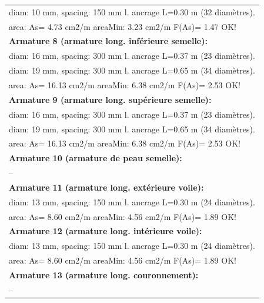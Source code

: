\begin{center}
\begin{supertabular}[H]{|l|}
  diam: 10 mm, spacing: 150 mm  l. ancrage L=0.30 m (32 diamètres).\\
  area: As=   4.73 cm2/m areaMin:   3.23 cm2/m  F(As)= 1.47 OK!\\
\textbf{Armature 8 (armature long. inférieure semelle):}\\
  diam: 16 mm, spacing: 300 mm  l. ancrage L=0.37 m (23 diamètres).\\
  diam: 19 mm, spacing: 300 mm  l. ancrage L=0.65 m (34 diamètres).\\
  area: As=  16.13 cm2/m areaMin:   6.38 cm2/m  F(As)= 2.53 OK!\\
\textbf{Armature 9 (armature long. supérieure semelle):}\\
  diam: 16 mm, spacing: 300 mm  l. ancrage L=0.37 m (23 diamètres).\\
  diam: 19 mm, spacing: 300 mm  l. ancrage L=0.65 m (34 diamètres).\\
  area: As=  16.13 cm2/m areaMin:   6.38 cm2/m  F(As)= 2.53 OK!\\
\textbf{Armature 10 (armature de peau semelle):}\\
  --\\
\textbf{Armature 11 (armature long. extérieure voile):}\\
  diam: 13 mm, spacing: 150 mm  l. ancrage L=0.30 m (24 diamètres).\\
  area: As=   8.60 cm2/m areaMin:   4.56 cm2/m  F(As)= 1.89 OK!\\
\textbf{Armature 12 (armature long. intérieure voile):}\\
  diam: 13 mm, spacing: 150 mm  l. ancrage L=0.30 m (24 diamètres).\\
  area: As=   8.60 cm2/m areaMin:   4.56 cm2/m  F(As)= 1.89 OK!\\
\textbf{Armature 13 (armature long. couronnement):}\\
  --\\
\hline
\end{supertabular}
\end{center}

